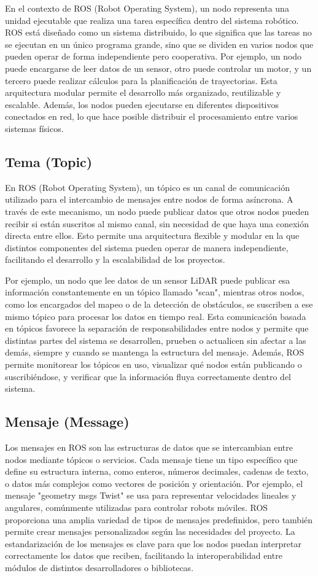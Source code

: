 En el contexto de ROS (Robot Operating System), un nodo representa una unidad ejecutable que realiza una tarea específica dentro del sistema robótico. ROS está diseñado como un sistema distribuido, lo que significa que las tareas no se ejecutan en un único programa grande, sino que se dividen en varios nodos que pueden operar de forma independiente pero cooperativa. Por ejemplo, un nodo puede encargarse de leer datos de un sensor, otro puede controlar un motor, y un tercero puede realizar cálculos para la planificación de trayectorias. Esta arquitectura modular permite el desarrollo más organizado, reutilizable y escalable. Además, los nodos pueden ejecutarse en diferentes dispositivos conectados en red, lo que hace posible distribuir el procesamiento entre varios sistemas físicos.

\subsection{Tema (Topic)}
En ROS (Robot Operating System), un tópico es un canal de comunicación utilizado para el intercambio de mensajes entre nodos de forma asíncrona. A través de este mecanismo, un nodo puede publicar datos que otros nodos pueden recibir si están suscritos al mismo canal, sin necesidad de que haya una conexión directa entre ellos. Esto permite una arquitectura flexible y modular en la que distintos componentes del sistema pueden operar de manera independiente, facilitando el desarrollo y la escalabilidad de los proyectos. 

Por ejemplo, un nodo que lee datos de un sensor LiDAR puede publicar esa información constantemente en un tópico llamado "scan", mientras otros nodos, como los encargados del mapeo o de la detección de obstáculos, se suscriben a ese mismo tópico para procesar los datos en tiempo real. Esta comunicación basada en tópicos favorece la separación de responsabilidades entre nodos y permite que distintas partes del sistema se desarrollen, prueben o actualicen sin afectar a las demás, siempre y cuando se mantenga la estructura del mensaje. Además, ROS permite monitorear los tópicos en uso, visualizar qué nodos están publicando o suscribiéndose, y verificar que la información fluya correctamente dentro del sistema.
\subsection{Mensaje (Message)}
Los mensajes en ROS son las estructuras de datos que se intercambian entre nodos mediante tópicos o servicios. Cada mensaje tiene un tipo específico que define su estructura interna, como enteros, números decimales, cadenas de texto, o datos más complejos como vectores de posición y orientación. Por ejemplo, el mensaje "geometry msgs Twist" se usa para representar velocidades lineales y angulares, comúnmente utilizadas para controlar robots móviles. ROS proporciona una amplia variedad de tipos de mensajes predefinidos, pero también permite crear mensajes personalizados según las necesidades del proyecto. La estandarización de los mensajes es clave para que los nodos puedan interpretar correctamente los datos que reciben, facilitando la interoperabilidad entre módulos de distintos desarrolladores o bibliotecas.


